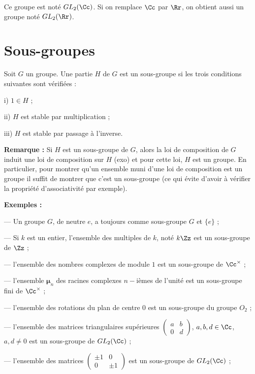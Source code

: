 \documentclass[class=report,crop=false]{standalone}
\newcommand{\GL}{GL}
\begin{document}
Ce groupe est noté $\GL_2(\Cc)$. Si on remplace $\Cc$ par $\Rr$, on obtient aussi un groupe noté $\GL_2(\Rr)$.


\section{Sous-groupes}

\begin{definition}
Soit $G$ un groupe. Une partie $H$ de $G$ est un sous-groupe si les trois conditions suivantes sont vérifiées :

 i) $1 \in H$ ;

ii) $H$ est stable par multiplication ;

iii) $H$ est stable par passage à l'inverse.

\end{definition}

{\bf Remarque : } Si $H$ est un sous-groupe de $G$, alors la loi de composition de $G$ induit une loi de composition sur $H$ (exo) et pour cette loi, $H$ est un groupe. En particulier, pour montrer qu'un ensemble muni d'une loi de composition est un groupe il suffit de montrer que c'est un sous-groupe (ce qui évite d'avoir à vérifier la propriété d'associativité par exemple).


{\bf Exemples :}


--- Un groupe $G$, de neutre $e$, a toujours comme sous-groupe $G$ et $\{e\}$ ;

--- Si $k$ est un entier, l'ensemble des multiples de $k$, noté $k\Zz$ est un sous-groupe de $\Zz$ ;

--- l'ensemble des nombres complexes de module $1$ est un sous-groupe de $\Cc^\times$ ;

--- l'ensemble  $\mathbf{\mu}_n$ des racines complexes $n-$ièmes de l'unité est un sous-groupe fini de $\Cc^\times$ ;

--- l'ensemble des rotations du plan de centre $0$ est un sous-groupe du groupe $O_2$ ;

--- l'ensemble des matrices triangulaires supérieures $\left(\begin{array}{cc}
a & b\\
0 & d
\end{array}\right)$, $a,b,d \in \Cc$, $a,d \neq 0$ est un sous-groupe de $\GL_2(\Cc)$ ;

--- l'ensemble des matrices $\left(\begin{array}{cc}
\pm 1 & 0\\
0&\pm 1
\end{array}\right)$ est un sous-groupe de $\GL_2(\Cc)$ ;
\end{document}
